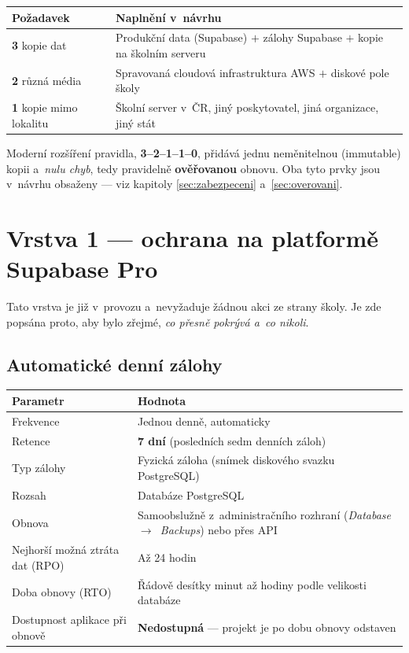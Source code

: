 \documentclass[11pt,a4paper]{article}
\begin{document}
\begin{center}
\begin{tabularx}{\textwidth}{@{}p{3.8cm}X@{}}
\toprule
\textbf{Požadavek} & \textbf{Naplnění v~návrhu} \\
\midrule
\textbf{3} kopie dat & Produkční data (Supabase) $+$ zálohy Supabase $+$ kopie na školním serveru \\
\textbf{2} různá média & Spravovaná cloudová infrastruktura AWS $+$ diskové pole školy \\
\textbf{1} kopie mimo lokalitu & Školní server v~ČR, jiný poskytovatel, jiná organizace, jiný stát \\
\bottomrule
\end{tabularx}
\end{center}

Moderní rozšíření pravidla, \textbf{3--2--1--1--0}, přidává jednu neměnitelnou (immutable) kopii
a~\emph{nulu chyb}, tedy pravidelně \textbf{ověřovanou} obnovu. Oba tyto prvky jsou v~návrhu
obsaženy --- viz kapitoly \ref{sec:zabezpeceni} a~\ref{sec:overovani}.

\newpage

\section{Vrstva 1 --- ochrana na platformě Supabase Pro}
\label{sec:vrstva1}

Tato vrstva je již v~provozu a~nevyžaduje žádnou akci ze strany školy. Je zde popsána proto, aby
bylo zřejmé, \emph{co přesně pokrývá a~co nikoli}.

\subsection{Automatické denní zálohy}

\begin{center}
\begin{tabularx}{\textwidth}{@{}p{4.4cm}X@{}}
\toprule
\textbf{Parametr} & \textbf{Hodnota} \\
\midrule
Frekvence & Jednou denně, automaticky \\
Retence & \textbf{7 dní} (posledních sedm denních záloh) \\
Typ zálohy & Fyzická záloha (snímek diskového svazku PostgreSQL) \\
Rozsah & Databáze PostgreSQL \\
Obnova & Samoobslužně z~administračního rozhraní (\emph{Database~$\rightarrow$~Backups}) nebo přes API \\
Nejhorší možná ztráta dat (RPO) & Až 24 hodin \\
Doba obnovy (RTO) & Řádově desítky minut až hodiny podle velikosti databáze \\
Dostupnost aplikace při obnově & \textbf{Nedostupná} --- projekt je po dobu obnovy odstaven \\
\bottomrule
\end{tabularx}
\end{center}
\end{document}
